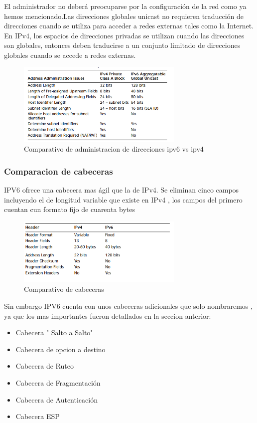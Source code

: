 \documentclass[11pt,a4paper]{article}
\begin{document}
El administrador no deberá preocuparse por la configuración de la red como ya hemos mencionado.Las direcciones globales unicast no requieren traducción de direcciones cuando se utiliza para acceder a
redes externas tales como la Internet. En IPv4, los espacios de direcciones privadas se utilizan cuando las direcciones son globales, entonces deben traducirse a un conjunto limitado de direcciones globales cuando se accede a redes externas.

\begin{figure}[h!]
 \centering
 \includegraphics[width=0.71\textwidth]{aaip46.png}
 \caption[Asignacion de prefijo]{Comparativo de administracion de direcciones ipv6 vs ipv4}
\end{figure} \par

\subsubsection{Comparacion de cabeceras}
IPV6 ofrece una cabecera mas ágil que la de IPv4. Se eliminan cinco campos incluyendo el de longitud variable que existe en IPv4 , los campos del primero cuentan cun formato fijo de cuarenta bytes

\begin{figure}[h!]
 \centering
 \includegraphics[width=0.71\textwidth]{compcab.png}
 \caption[Asignacion de prefijo]{Comparativo de cabeceras }
\end{figure} \par

Sin embargo IPV6 cuenta con unos cabeceras adicionales que solo nombraremos , ya que los mas importantes fueron detallados en la seccion anterior:
\begin{itemize}
\item Cabecera " Salto a Salto" 
\item Cabecera de opcion a destino
\item  Cabecera  de Ruteo
\item Cabecera de Fragmentación
\item Cabecera de Autenticación
\item  Cabecera ESP
\end{itemize}
\end{document}
